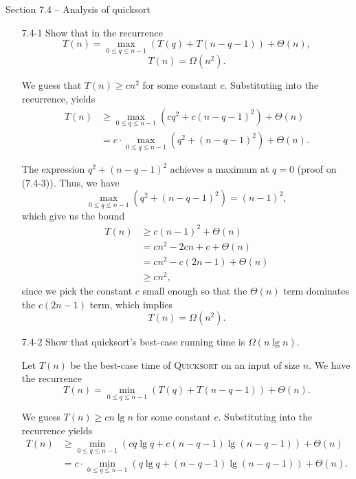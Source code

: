 \documentclass{report}
\makeatletter
\renewenvironment{framed}{%
 \def\FrameCommand##1{\hskip\@totalleftmargin
 \fboxsep=\FrameSep\fbox{##1}}%
 \MakeFramed {\advance\hsize-\width
   \@totalleftmargin\z@ \linewidth\hsize
   \@setminipage}}%
 {\par\unskip\endMakeFramed}
\makeatother
\begin{document}
\newpage

{\large Section 7.4 {--} Analysis of quicksort}

\begin{enumerate}

\item[7.4{-}1]{Show that in the recurrence
\[
  T(n) = \max_{0 \le q \le n - 1}(T(q) + T(n - q - 1)) + \Theta(n),
\]
\[
  T(n) = \Omega(n^2).
\]}

\begin{framed}
We guess that $T(n) \ge cn^2$ for some constant $c$. Substituting into the
recurrence, yields
\begin{equation*}
\begin{aligned}
  T(n) &\ge \max_{0 \le q \le n - 1}(cq^2 + c(n - q - 1)^2) + \Theta(n)\\
       &=   c \cdot \max_{0 \le q \le n - 1}(q^2 + (n - q - 1)^2) + \Theta(n).
\end{aligned}
\end{equation*}

The expression $q^2 + (n - q - 1)^2$ achieves a maximum at $q = 0$ (proof on
(7.4-3)). Thus, we have
\[
  \max_{0 \le q \le n - 1}(q^2 + (n - q - 1)^2) = (n - 1)^2,
\]
which give us the bound
\begin{equation*}
\begin{aligned}
  T(n) &\ge c (n - 1)^2 + \Theta(n)\\
       &=   cn^2 - 2cn + c + \Theta(n)\\
       &=   cn^2 - c(2n - 1) + \Theta(n)\\
       &\ge cn^2,
\end{aligned}
\end{equation*}
since we pick the constant $c$ small enough so that the $\Theta(n)$ term
dominates the $c(2n - 1)$ term, which implies
\[
  T(n) = \Omega(n^2).
\]
\end{framed}

\item[7.4{-}2]{Show that quicksort's best-case running time is $\Omega(n \lg n)$.}

\begin{framed}
Let $T(n)$ be the best-case time of \textsc{Quicksort} on an input of size
$n$. We have the recurrence
\[
  T(n) = \min_{0 \le q \le n - 1}(T(q) + T(n - q - 1)) + \Theta(n).
\]

We guess $T(n) \ge cn \lg n$ for some constant $c$. Substituting into the
recurrence yields
\begin{equation*}
\begin{aligned}
  T(n) &\ge \min_{0 \le q \le n - 1}(cq \lg q + c(n - q - 1) \lg (n - q - 1)) + \Theta(n)\\
       &=   c \cdot \min_{0 \le q \le n - 1}(q \lg q + (n - q - 1) \lg (n - q - 1)) + \Theta(n).
\end{aligned}
\end{equation*}


\end{framed}
\end{enumerate}
\end{document}
